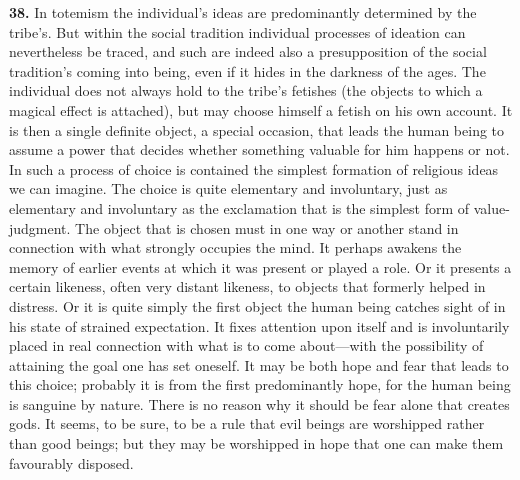 \documentclass[12pt,a4paper]{book}
\newcommand{\opage}[1]{\marginnote{\footnotesize\textit{[#1]}}}
\begin{document}
\medskip

\noindent\textbf{38.} In totemism the individual's ideas are predominantly determined
by the tribe's. But within the social tradition individual processes of ideation can
nevertheless be traced, and such are indeed also a presupposition of the social
tradition's coming into being, even if it hides in the darkness of the ages. The
individual does not always hold to the tribe's fetishes (the objects to which a magical
effect is attached), but may choose himself a fetish on his own account. It is then a
single definite object, a special occasion, that leads the human being to assume a
power that decides whether something valuable for him happens or not. In such a process
of choice is contained the simplest formation of religious ideas we can imagine. The
choice is quite elementary and involuntary, just as elementary and 
\opage{89}involuntary as the
exclamation that is the simplest form of value-judgment. The object that is chosen must
in one way or another stand in connection with what strongly occupies the mind. It
perhaps awakens the memory of earlier events at which it was present or played a role.
Or it presents a certain likeness, often very distant likeness, to objects that
formerly helped in distress. Or it is quite simply the first object the human being
catches sight of in his state of strained expectation. It fixes attention upon itself
and is involuntarily placed in real connection with what is to come about---with the
possibility of attaining the goal one has set oneself. It may be both hope and fear that
leads to this choice; probably it is from the first predominantly hope, for the human
being is sanguine by nature. There is no reason why it should be fear alone that creates
gods. It seems, to be sure, to be a rule that evil beings are worshipped rather than good
beings; but they may be worshipped in hope that one can make them favourably disposed.
\end{document}
